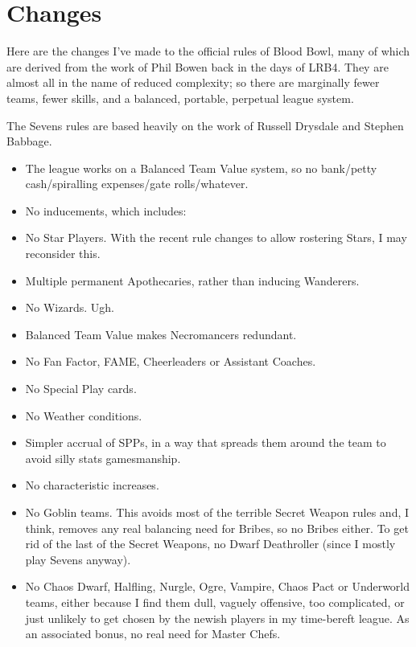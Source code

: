 \section{Changes}

\begin{multicols}{2}

\par Here are the changes I've made to the official rules of Blood Bowl, many of which are derived from the work of Phil Bowen back in the days of LRB4. They are almost all in the name of reduced complexity; so there are marginally fewer teams, fewer skills, and a balanced, portable, perpetual league system.
\par The Sevens rules are based heavily on the work of Russell Drysdale and Stephen Babbage.

\begin{itemize}
\item The league works on a Balanced Team Value system, so no bank/petty cash/spiralling expenses/gate rolls/whatever.
\item No inducements, which includes:
\item No Star Players. With the recent rule changes to allow rostering Stars, I may reconsider this.
\item Multiple permanent Apothecaries, rather than inducing Wanderers.
\item No Wizards. Ugh.
\item Balanced Team Value makes Necromancers redundant.
\item No Fan Factor, FAME, Cheerleaders or Assistant Coaches.
\item No Special Play cards.
\item No Weather conditions.
\item Simpler accrual of SPPs, in a way that spreads them around the team to avoid silly stats gamesmanship.
\item No characteristic increases.
\item No Goblin teams. This avoids most of the terrible Secret Weapon rules and, I think, removes any real balancing need for Bribes, so no Bribes either. To get rid of the last of the Secret Weapons, no Dwarf Deathroller (since I mostly play Sevens anyway).
\item No Chaos Dwarf, Halfling, Nurgle, Ogre, Vampire, Chaos Pact or Underworld teams, either because I find them dull, vaguely offensive, too complicated, or just unlikely to get chosen by the newish players in my time-bereft league. As an associated bonus, no real need for Master Chefs.

\end{itemize}
\end{multicols}

